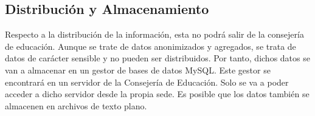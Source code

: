 \subsection{Distribución y Almacenamiento}
Respecto a la distribución de la información, esta no podrá salir de la consejería de educación. Aunque se trate de datos anonimizados y agregados, se trata de datos de carácter sensible y no pueden ser distribuidos. Por tanto, dichos datos se van a almacenar en un gestor de bases de datos MySQL. Este gestor se encontrará en un servidor de la Consejería de Educación. Solo se va a poder acceder a dicho servidor desde la propia sede. Es posible que los datos también se almacenen en archivos de texto plano.
